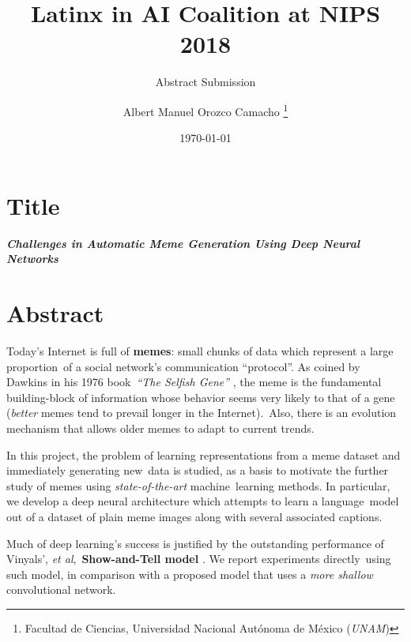 \documentclass[paper=letter, fontsize=11pt]{scrartcl}
\title{
  \normalsize
  Latinx in AI Coalition at NIPS 2018
}
\subtitle{\normalsize Abstract Submission}
\author{\normalsize Albert Manuel Orozco Camacho
        \footnote{Facultad de Ciencias,
        Universidad Nacional Autónoma de México (\emph{UNAM})}}
\date{\normalsize \today}
\begin{document}
\maketitle

\section*{Title}

\noindent
\emph{\textbf{Challenges in Automatic Meme Generation Using Deep Neural Networks}}

\section*{Abstract}

\noindent
Today's Internet is full of \textbf{memes}: small chunks of data which represent a large proportion\
of a social network's communication ``protocol''. As coined by Dawkins in his 1976 book\
\emph{``The Selfish Gene''} \cite{dawkins2006}, the meme is the fundamental building-block of information whose behavior seems very likely to that of a gene (\emph{better} memes tend to prevail longer in the Internet).\
Also, there is an evolution mechanism that allows older memes to adapt to current trends.\par
In this project, the problem of learning representations from a meme dataset and immediately generating new\
data is studied, as a basis to motivate the further study of memes using \emph{state-of-the-art} machine\
learning methods. In particular, we develop a deep neural architecture which attempts to learn a language\
model out of a dataset of plain meme images along with several associated captions.\par
Much of deep learning's success is justified by the outstanding performance of Vinyals', \textit{et al},\
\textbf{Show-and-Tell model} \cite{DBLP:journals/corr/VinyalsTBE14}. We report experiments directly\
using such model, in comparison with a proposed model that uses a \emph{more shallow} convolutional network.
\end{document}
